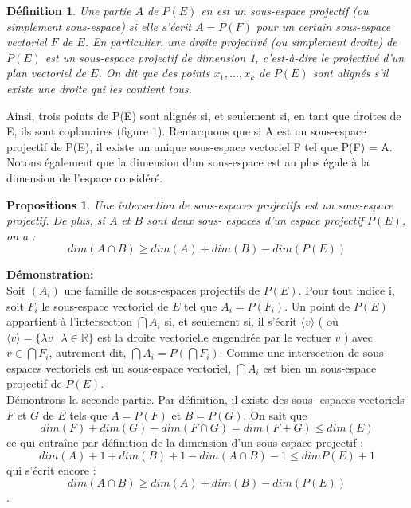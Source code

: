 \documentclass[12pt]{report}
\newtheorem{madef}{Définition}[section]
\newtheorem{propos}{Propositions}[section]
\begin{document}
\begin{madef}
  Une partie $A$ de $P(E)$ en est un sous-espace 
 projectif (ou simplement sous-espace) si elle s'écrit $A = P(F)$ pour 
 un certain sous-espace vectoriel $F$ de $E$. 
 En particulier, une droite projectivé (ou simplement droite) de 
 $P(E)$ est un sous-espace projectif de dimension 1, c'est-à-dire le 
 projectivé d'un plan vectoriel de $E$. 
 On dit que des points $x_{1},... ,x_{k}$ de $P(E)$ sont alignés s'il existe 
 une droite qui les contient tous. 
\end{madef}
Ainsi, trois points de P(E) sont alignés si, et seulement si, en tant 
que droites de E, ils sont coplanaires (figure 1). 
Remarquons que si A est un sous-espace projectif de P(E), il existe 
un unique sous-espace vectoriel F tel que P(F) = A. 
Notons également que la dimension d'un sous-espace est au plus 
égale à la dimension de l'espace considéré.\\
\begin{propos}
Une intersection de sous-espaces projectifs 
est un sous-espace projectif. De plus, si $A$ et $B$ sont deux sous- 
espaces d'un espace projectif $P(E)$, on a : 
	$$ dim(A\cap B) \geq dim(A) + dim(B) - dim(P(E)) $$
\end{propos}
\textbf{Démonstration:} \\
Soit $(A_{i})$ une famille de sous-espaces projectifs 
de $P(E)$. Pour tout indice i, soit $F_{i}$ le sous-espace vectoriel de $E$ 
tel que $A_{i} = P(F_{i})$. Un point de $P(E)$ appartient à l'intersection 
$\bigcap A_{i}$ si, et seulement si, il s'écrit $\langle v \rangle$ ( où $\langle v \rangle =\{ \lambda v \  | \   \lambda \in \mathbb{R} \} $ est la droite vectorielle engendrée par le vectuer $v$ ) avec $v \in \bigcap F_{i}$, autrement 
dit, $\bigcap A_{i} = P(\bigcap F_{i})$. Comme une intersection de sous-espaces  
vectoriels est un sous-espace vectoriel, $\bigcap A_{i}$ est bien un sous-espace 
projectif de $P(E)$. \\
Démontrons la seconde partie. Par définition, il existe des sous- 
espaces vectoriels $F$ et $G$ de $E$ tels que $A = P(F)$ et $B = P(G)$. 
On sait que 
$$ dim(F) + dim(G) - dim(F \cap G) = dim(F + G) \leq dim(E) $$
ce qui entraîne par définition de la dimension d'un sous-espace 
projectif : 
$$ dim (A) + 1 + dim(B) + 1 - dim(A \cap B)- 1\leq dimP(E) + 1$$
qui s'écrit encore : 
$$dim(A \cap B) \geq dim(A) + dim(B) - dim(P(E))$$. 
\end{document}
